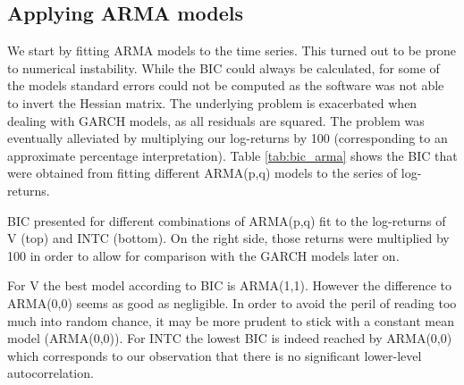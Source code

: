 \begin{figure}[h]
    \centering
    \begin{adjustbox}{width=.95\textwidth,center}
    
    
    \end{adjustbox}
    \caption{}
    \label{fig:ljungbox}
\end{figure}{}

\subsection{Applying ARMA models}
We start by fitting ARMA models to the time series. This turned out to be prone to numerical instability. While the BIC could always be calculated, for some of the models standard errors could not be computed as the software was not able to invert the Hessian matrix. The underlying problem is exacerbated when dealing with GARCH models, as all residuals are squared. The problem was eventually alleviated by multiplying our log-returns by 100 (corresponding to an approximate percentage interpretation). Table \ref{tab:bic_arma} shows the BIC that were obtained from fitting different ARMA(p,q) models to the series of log-returns. 

\begin{table}
    \centering
    
    \caption{BIC presented for different combinations of ARMA(p,q) fit to the log-returns of V (top) and INTC (bottom). On the right side, those returns were multiplied by 100 in order to allow for comparison with the GARCH models later on.}
    \label{tab:bic_arma}
\end{table}{}

For V the best model according to BIC is ARMA(1,1). However the difference to ARMA(0,0) seems as good as negligible. In order to avoid the peril of reading too much into random chance, it may be more prudent to stick with a constant mean model (ARMA(0,0)). For INTC the lowest BIC is indeed reached by ARMA(0,0) which corresponds to our observation that there is no significant lower-level autocorrelation. 

